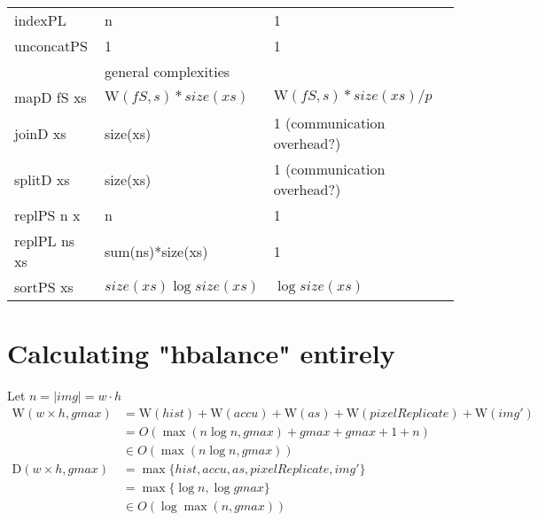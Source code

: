 \documentclass{article}
\newcommand{\W}[0]{\textrm{W}}
\newcommand{\D}[0]{\textrm{D}}
\begin{document}
\begin{table}[h]
\begin{tabular}{lll}
              indexPL         & n                   & 1 \\
              unconcatPS      & 1                   & 1 \\
              \midrule
              & general complexities & \\
              mapD fS xs      & $\W(fS,s)*size(xs)$ & $\W(fS,s)*size(xs)/p$ \\
              joinD xs        & size(xs)          & 1 \tiny (communication overhead?) \\
              splitD xs       & size(xs)          & 1 \tiny (communication overhead?) \\
              replPS n x      & n                   & 1 \\
              replPL ns xs    & sum(ns)*size(xs)    & 1 \\
              sortPS xs       & $size(xs) \log size(xs)$ & $\log size(xs)$ \\
          \end{tabular}
        \end{table}
        
    \section{Calculating "hbalance" entirely}
      Let $n = |img| = w\cdot h$
      \begin{equation}
      \begin{split}
      \W(w \times h,gmax)
            & = \W(hist) + \W(accu) + \W(as) + \W(pixelReplicate) + \W(img') \\
            & = O( \max(n \log n, gmax) + gmax + gmax + 1 + n) \\
            & \in O(\max(n \log n, gmax)) \\
      \D(w \times h,gmax)
          & = \max \{ hist, accu, as, pixelReplicate, img'\} \\
          & = \max \{\log n, \log gmax \} \\
          & \in O(\log \max(n,gmax)) \\
      \end{split}
      \end{equation}
        
\end{document}
